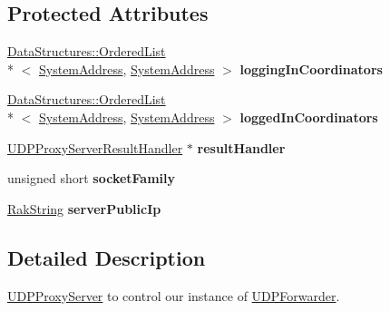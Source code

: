 \subsection*{Protected Attributes}
\begin{DoxyCompactItemize}
\item 
\hypertarget{class_rak_net_1_1_u_d_p_proxy_server_ae951880446386b213aca998fede8a85b}{\hyperlink{class_data_structures_1_1_ordered_list}{Data\-Structures\-::\-Ordered\-List}\\*
$<$ \hyperlink{struct_rak_net_1_1_system_address}{System\-Address}, \hyperlink{struct_rak_net_1_1_system_address}{System\-Address} $>$ {\bfseries logging\-In\-Coordinators}}\label{class_rak_net_1_1_u_d_p_proxy_server_ae951880446386b213aca998fede8a85b}

\item 
\hypertarget{class_rak_net_1_1_u_d_p_proxy_server_a5e0d72fabb9390c1023d5cc0803af9b9}{\hyperlink{class_data_structures_1_1_ordered_list}{Data\-Structures\-::\-Ordered\-List}\\*
$<$ \hyperlink{struct_rak_net_1_1_system_address}{System\-Address}, \hyperlink{struct_rak_net_1_1_system_address}{System\-Address} $>$ {\bfseries logged\-In\-Coordinators}}\label{class_rak_net_1_1_u_d_p_proxy_server_a5e0d72fabb9390c1023d5cc0803af9b9}

\item 
\hypertarget{class_rak_net_1_1_u_d_p_proxy_server_aa07a091fb3a9b874730a0f28355215ea}{\hyperlink{struct_rak_net_1_1_u_d_p_proxy_server_result_handler}{U\-D\-P\-Proxy\-Server\-Result\-Handler} $\ast$ {\bfseries result\-Handler}}\label{class_rak_net_1_1_u_d_p_proxy_server_aa07a091fb3a9b874730a0f28355215ea}

\item 
\hypertarget{class_rak_net_1_1_u_d_p_proxy_server_adde45c8fc65300ad426fe1039011563f}{unsigned short {\bfseries socket\-Family}}\label{class_rak_net_1_1_u_d_p_proxy_server_adde45c8fc65300ad426fe1039011563f}

\item 
\hypertarget{class_rak_net_1_1_u_d_p_proxy_server_adc6178ee0ba88e50618dc2f60699ab76}{\hyperlink{class_rak_net_1_1_rak_string}{Rak\-String} {\bfseries server\-Public\-Ip}}\label{class_rak_net_1_1_u_d_p_proxy_server_adc6178ee0ba88e50618dc2f60699ab76}

\end{DoxyCompactItemize}


\subsection{Detailed Description}
\hyperlink{class_rak_net_1_1_u_d_p_proxy_server}{U\-D\-P\-Proxy\-Server} to control our instance of \hyperlink{class_rak_net_1_1_u_d_p_forwarder}{U\-D\-P\-Forwarder}. 


